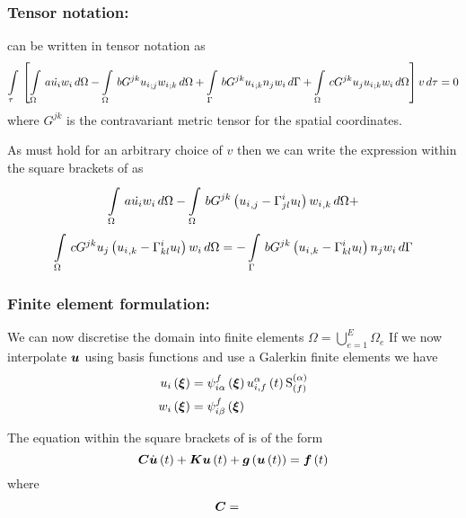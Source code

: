 \subsubsection{Tensor notation:}

 can be written in tensor notation as
\begin{equation}
    \displaystyle\int\limits_{\tau}^{} \,\left[   \displaystyle\int\limits_{\Omega}^{} \,a\dot{u_{i}}w_{i}\,d\Omega -
        \displaystyle\int\limits_{\Omega}^{} \,bG^{jk} {u_{i}}_{;j}  {w_{i}}_{;k} \,d\Omega +
        \displaystyle\int\limits_{\Gamma}^{} \,bG^{jk} {u_{i}}_{;k} n_{j}w_{i}\,d\Gamma  +
        \displaystyle\int\limits_{\Omega}^{} \,cG^{jk}u_{j} {u_{i}}_{;k} w_{i}\,d\Omega  \right]v\,d\tau =0
  \label{eqn:Burgerstensorform1}
\end{equation}
where $G^{jk}$ is the contravariant metric tensor for the spatial coordinates.

As  must hold for an arbitrary choice of $v$
then we can write the expression within the square brackets of
 as
\begin{multline}
    \displaystyle\int\limits_{\Omega}^{} \,a\dot{u_{i}}w_{i}\,d\Omega -
    \displaystyle\int\limits_{\Omega}^{} \,bG^{jk}\left(  {u_{i}}_{,j} - \Gamma^{i}_{jl} u_{l} \right) {w_{i}}_{,k} \,d\Omega +\\
    \displaystyle\int\limits_{\Omega}^{} \,cG^{jk}u_{j}\left(  {u_{i}}_{,k} - \Gamma^{i}_{kl} u_{l} \right)w_{i}\,d\Omega  =
  -  \displaystyle\int\limits_{\Gamma}^{} \,bG^{jk}\left(  {u_{i}}_{,k} - \Gamma^{i}_{kl} u_{l} \right)n_{j}w_{i}\,d\Gamma  
  \label{eqn:Burgerstensorform2}
\end{multline}

\subsubsection{Finite element formulation:}
We can now discretise the domain into finite elements \ie $\Omega=
\displaystyle{\bigcup_{e=1}^{E}}\Omega_{e}$
If we now interpolate $\vect{u}$ using basis functions and use a Galerkin
finite elements we have
\begin{align}
  \fnof{u_{i}}{\vect{\xi}} &=
  \idxgbfn{i}{\alpha}{f}{\vect{\xi}}\fnof{\idxnodedof{u}{i}{\alpha}{f}}{t}\gsf{(\alpha)}{(f)}
  \\
  \fnof{w_{i}}{\vect{\xi}} &= \idxgbfn{i}{\beta}{f}{\vect{\xi}}
\end{align}

The equation within the square brackets of  is
of the form
\begin{equation}
  \matr{C}\fnof{\dot{\vect{u}}}{t}+\matr{K}\fnof{\vect{u}}{t}+\fnof{\vect{g}}{\fnof{\vect{u}}{t}}=\fnof{\vect{f}}{t}
\end{equation}
where
\begin{align}
  \matr{C} &=
\end{align}
